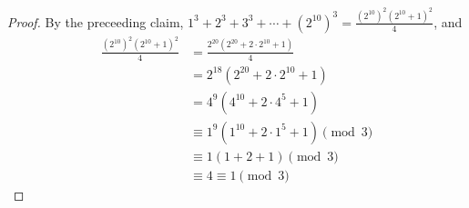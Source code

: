 \documentclass[12pt]{midterm}
\begin{document}
\begin{exam}
\begin{solution}
\begin{solutiontext}
\begin{proof}
  By the preceeding claim, $1^3 + 2^3 + 3^3 + \cdots + (2^{10})^3 = \displaystyle\frac{(2^{10})^2 (2^{10}+1)^2}{4}$, and
\begin{align*}
\frac{(2^{10})^2 (2^{10}+1)^2}{4}
&= \frac{2^{20} (2^{20}+2 \cdot 2^{10} + 1)}{4} \\
&= 2^{18} (2^{20}+2 \cdot 2^{10} + 1) \\
&= 4^{9} (4^{10}+2 \cdot 4^{5} + 1) \\
&\equiv 1^{9} (1^{10}+2 \cdot 1^{5} + 1) \pmod 3\\
&\equiv 1 (1+2 + 1) \pmod 3\\
&\equiv 4 \equiv 1 \pmod 3
\end{align*}
\end{proof}

\end{solutiontext}\end{solution}


\end{exam}
\end{document}
